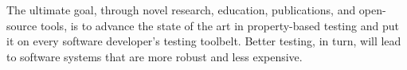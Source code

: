The ultimate goal, through novel research, education, publications, and open-source
tools, is to advance the state of the art in property-based testing
and put it on every
software developer's testing toolbelt.  Better testing, in turn, will
lead to software systems that are more robust and less expensive.


